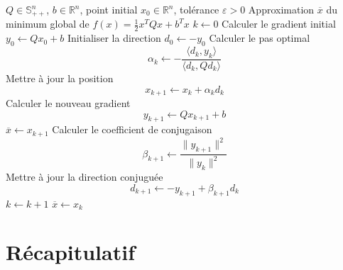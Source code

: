 \begin{algorithm}[H]
\caption{Algorithme du Gradient Conjugué (GC)}
\begin{algorithmic}[1]
\Require $Q \in \mathbb{S}_{++}^n$, $b \in \mathbb{R}^n$, point initial $x_0 \in \mathbb{R}^n$, tolérance $\varepsilon > 0$
\Ensure Approximation $\overline{x}$ du minimum global de $f(x) = \tfrac{1}{2} x^T Q x + b^T x$
\State $k \gets 0$
\State Calculer le gradient initial $y_0 \gets Q x_0 + b$
\State Initialiser la direction $d_0 \gets - y_0$
    \State Calculer le pas optimal 
        \[
            \alpha_k \gets - \frac{\langle d_k, y_k \rangle}{\langle d_k, Q d_k \rangle}
        \]
    \State Mettre à jour la position 
        \[
            x_{k+1} \gets x_k + \alpha_k d_k
        \]
    \State Calculer le nouveau gradient 
        \[
            y_{k+1} \gets Q x_{k+1} + b
        \]
        \State \Return $\overline{x} \gets x_{k+1}$ 
    \EndIf
    \State Calculer le coefficient de conjugaison
        \[
            \beta_{k+1} \gets \frac{\| y_{k+1} \|^2}{\| y_k \|^2}
        \]
    \State Mettre à jour la direction conjuguée 
        \[
            d_{k+1} \gets - y_{k+1} + \beta_{k+1} d_k
        \]
    \State $k \gets k + 1$
\EndWhile
\State \Return $\overline{x} \gets x_k$
\end{algorithmic}
\end{algorithm}




\newpage
\section{Récapitulatif}

